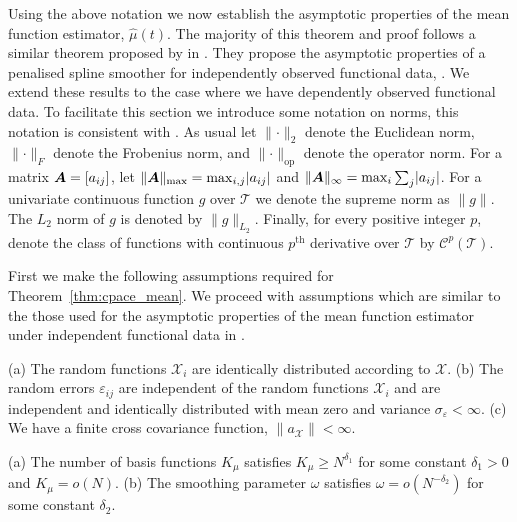 Using the above notation we now establish the asymptotic properties of the mean function estimator, $\hat{\mu}(t)$. 
The majority of this theorem and proof follows a similar theorem proposed by \citeauthor{xiao_asymptotic_2020} in \citep{xiao_asymptotic_2020}.
They propose the asymptotic properties of a penalised spline smoother for independently observed functional data, \citep{xiao_asymptotic_2020}.
We extend these results to the case where we have dependently observed functional data.
To facilitate this section we introduce some notation on norms, this notation is consistent with \citep{xiao_asymptotic_2020}. 
As usual let $\lVert \cdot \rVert_2$ denote the Euclidean norm, $\lVert \cdot \rVert_{F}$ denote the Frobenius norm, and $\lVert \cdot \rVert_\text{op}$ denote the operator norm.
For a matrix $\bm{{A}} = \left[a_{ij}\right]$, let $\lVert \bm{{A}} \rVert_\text{max} = \max_{i,j} \lvert a_{ij} \rvert$ and $\lVert \bm{{A}} \rVert_\infty = \max_i \sum_j \lvert a_{ij} \rvert$.
For a univariate continuous function $g$ over $\mathcal{T}$ we denote the supreme norm as $\lVert g \rVert$.
The $L_2$ norm of $g$ is denoted by $\lVert g \rVert_{L_2}$.
Finally, for every positive integer $p$, denote the class of functions with continuous $p^\text{th}$ derivative over $\mathcal{T}$ by $\mathcal{C}^p(\mathcal{T})$.

First we make the following assumptions required for Theorem~\ref{thm:cpace_mean}. 
We proceed with assumptions which are similar to the those used for the asymptotic properties of the mean function estimator under independent functional data in \citep{xiao_asymptotic_2020}.
\begin{assumption}
	(a) The random functions $\mathcal{X}_i$ are identically distributed according to $\mathcal{X}$. (b) The random errors $\varepsilon_{ij}$ are independent of the random functions $\mathcal{X}_i$ and are independent and identically distributed with mean zero and variance $\sigma_\varepsilon < \infty$. (c) We have a finite cross covariance function, $\lVert a_\mathcal{X}\rVert < \infty$. 
	\label{ass:1}
\end{assumption}

\begin{assumption}
	(a) The number of basis functions $K_\mu$ satisfies $K_\mu \geq N^{\delta_1}$ for some constant $\delta_1 > 0$ and $K_\mu = o(N)$. (b) The smoothing parameter  $\omega$ satisfies $\omega = o(N^{-\delta_2})$ for some constant $\delta_2$. 
	\label{ass:2}
\end{assumption}


